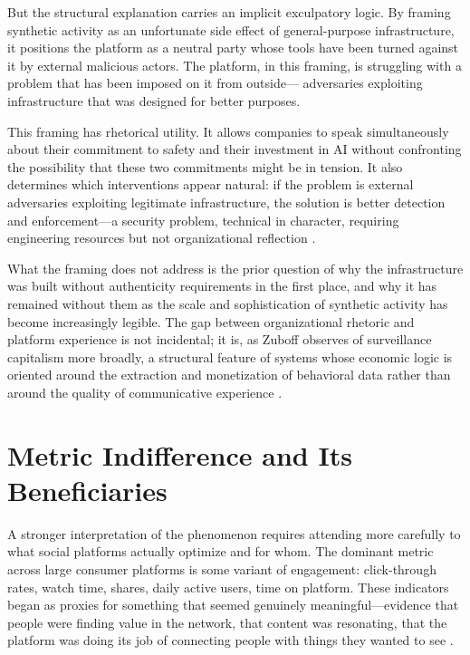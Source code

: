 \documentclass[12pt,a4paper]{article}
\begin{document}
But the structural explanation carries an implicit exculpatory logic. By framing synthetic
activity as an unfortunate side effect of general-purpose infrastructure, it positions the platform
as a neutral party whose tools have been turned against it by external malicious actors. The
platform, in this framing, is struggling with a problem that has been imposed on it from outside---
adversaries exploiting infrastructure that was designed for better purposes.

This framing has rhetorical utility. It allows companies to speak simultaneously about their
commitment to safety and their investment in AI without confronting the possibility that these
two commitments might be in tension. It also determines which interventions appear natural: if
the problem is external adversaries exploiting legitimate infrastructure, the solution is better
detection and enforcement---a security problem, technical in character, requiring engineering
resources but not organizational reflection \citep{gillespie2018}.

What the framing does not address is the prior question of why the infrastructure was built
without authenticity requirements in the first place, and why it has remained without them as
the scale and sophistication of synthetic activity has become increasingly legible. The gap
between organizational rhetoric and platform experience is not incidental; it is, as Zuboff
observes of surveillance capitalism more broadly, a structural feature of systems whose economic
logic is oriented around the extraction and monetization of behavioral data rather than around
the quality of communicative experience \citep{zuboff2019}.

\section{Metric Indifference and Its Beneficiaries}

A stronger interpretation of the phenomenon requires attending more carefully to what social
platforms actually optimize and for whom. The dominant metric across large consumer platforms
is some variant of engagement: click-through rates, watch time, shares, daily active users,
time on platform. These indicators began as proxies for something that seemed genuinely
meaningful---evidence that people were finding value in the network, that content was
resonating, that the platform was doing its job of connecting people with things they wanted
to see \citep{wu2016}.
\end{document}
